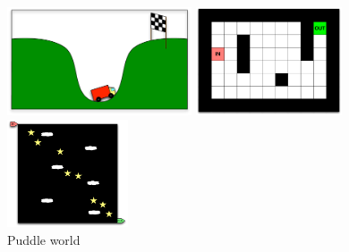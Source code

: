 \begin{figure}[ht!]
\begin{minipage}[t]{0.31\linewidth}
\center
\includegraphics[height=3.2cm]{MC_problem.pdf}
\caption{Mountain car
}\label{fig:MC:problem}
\end{minipage}
\hspace{0.1mm}
\begin{minipage}[t]{0.25\linewidth}
\center
\includegraphics[height=3.2cm]{MZ_problem.pdf}
\caption{Maze
}\label{fig:MZ:problem}
\end{minipage}
\hspace{0.1mm}
\begin{minipage}[t]{0.22\linewidth}
\center
\includegraphics[height=3.2cm]{PW_problem.pdf}
\caption{Puddle world
}\label{fig:PW:problem}
\end{minipage}
\hspace{0.1mm}
\begin{minipage}[t]{0.19\linewidth}

\end{minipage}
\end{figure}

